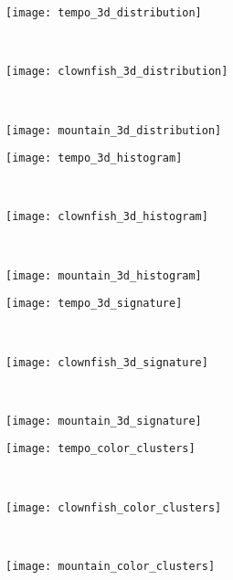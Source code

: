 \begin{figure}[!ht]
    
    \begin{subfigure}[t]{\textwidth+20pt\relax}
    	\texttt{[image: tempo\_3d\_distribution]}
    \end{subfigure}~ 
    \begin{subfigure}[b]{0.32\textwidth}
        \texttt{[image: clownfish\_3d\_distribution]}
    \end{subfigure}~
    \begin{subfigure}[b]{0.32\textwidth}
        \texttt{[image: mountain\_3d\_distribution]}
    \end{subfigure}%
    
    
    \begin{subfigure}[t]{\textwidth+20pt\relax}
    	\texttt{[image: tempo\_3d\_histogram]}
    \end{subfigure}~ 
    \begin{subfigure}[b]{0.32\textwidth}
        \texttt{[image: clownfish\_3d\_histogram]}
    \end{subfigure}~
    \begin{subfigure}[b]{0.32\textwidth}
        \texttt{[image: mountain\_3d\_histogram]}
    \end{subfigure}%
    
    
    \begin{subfigure}[t]{\textwidth+20pt\relax}
    	\texttt{[image: tempo\_3d\_signature]}
    \end{subfigure}~ 
    \begin{subfigure}[b]{0.32\textwidth}
        \texttt{[image: clownfish\_3d\_signature]}
    \end{subfigure}~
    \begin{subfigure}[b]{0.32\textwidth}
        \texttt{[image: mountain\_3d\_signature]}
    \end{subfigure}\vspace{2pt}
    
    
    \begin{subfigure}[t]{\textwidth+20pt\relax}
    	\texttt{[image: tempo\_color\_clusters]}
    \end{subfigure}~ 
    \begin{subfigure}[b]{0.32\textwidth}
        \texttt{[image: clownfish\_color\_clusters]}
    \end{subfigure}~
    \begin{subfigure}[b]{0.32\textwidth}
        \texttt{[image: mountain\_color\_clusters]}
    \end{subfigure}\vspace{-10pt}
    

\end{figure}

